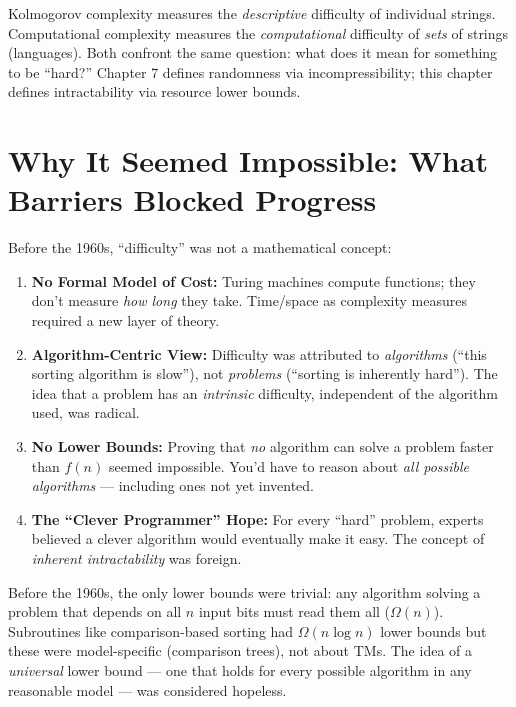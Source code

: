 Kolmogorov complexity measures the \emph{descriptive} difficulty of individual strings. Computational complexity measures the \emph{computational} difficulty of \emph{sets} of strings (languages). Both confront the same question: what does it mean for something to be ``hard?'' Chapter 7 defines randomness via incompressibility; this chapter defines intractability via resource lower bounds.

\section{Why It Seemed Impossible: What Barriers Blocked Progress}
\label{sec:complexity:impossible}

Before the 1960s, ``difficulty'' was not a mathematical concept:

\begin{enumerate}
\item \textbf{No Formal Model of Cost:} Turing machines compute functions; they don't measure \emph{how long} they take. Time/space as complexity measures required a new layer of theory.
\item \textbf{Algorithm-Centric View:} Difficulty was attributed to \emph{algorithms} (``this sorting algorithm is slow''), not \emph{problems} (``sorting is inherently hard''). The idea that a problem has an \emph{intrinsic} difficulty, independent of the algorithm used, was radical.
\item \textbf{No Lower Bounds:} Proving that \emph{no} algorithm can solve a problem faster than $f(n)$ seemed impossible. You'd have to reason about \emph{all possible algorithms} — including ones not yet invented.
\item \textbf{The ``Clever Programmer'' Hope:} For every ``hard'' problem, experts believed a clever algorithm would eventually make it easy. The concept of \emph{inherent intractability} was foreign.
\end{enumerate}

Before the 1960s, the only lower bounds were trivial: any algorithm solving a problem that depends on all $n$ input bits must read them all ($\Omega(n)$). Subroutines like comparison-based sorting had $\Omega(n \log n)$ lower bounds but these were model-specific (comparison trees), not about TMs. The idea of a \emph{universal} lower bound — one that holds for every possible algorithm in any reasonable model — was considered hopeless.

